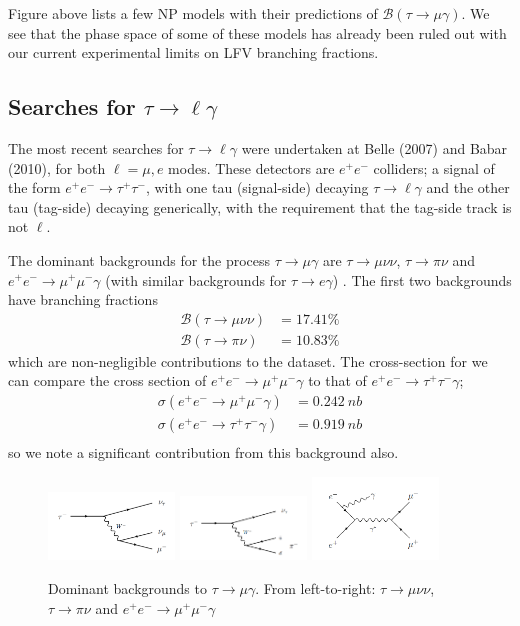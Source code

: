 \documentclass[12pt,a4paper]{article} %
\newcommand{\br}{\mathcal{B}}
\newcommand{\tmg}{\tau\to\mu\gamma}
\newcommand{\tlg}{\tau\to\ell\gamma}
\begin{document}
Figure above lists a few NP models with their predictions of $\br(\tmg)$. We see that the phase space of some of these models has already been ruled out with our current experimental limits on LFV branching fractions.



\subsection{Searches for $\tlg$}

The most recent searches for $\tlg$ were undertaken at Belle (2007) and Babar (2010), for both $\ell=\mu,e$ modes. These detectors are $e^+ e^-$ colliders; a signal of the form $e^+ e^-\to \tau^+ \tau^-$, with one tau (signal-side) decaying $\tau\to \ell \gamma$ and the other tau (tag-side) decaying generically, with the requirement that the tag-side track is not $\ell$.

The dominant backgrounds for the process $\tmg$ are $\tau\to \mu \nu \nu$, $\tau\to \pi \nu$ and $e^+ e^- \to \mu^+ \mu^- \gamma$ (with similar backgrounds for $\tau\to e \gamma$) \cite{Hayasaka:2007}. The first two backgrounds have branching fractions
\begin{align}
\br(\tau\to \mu \nu \nu)&=17.41\%\\
\br(\tau\to\pi\nu)&=10.83\%
\end{align}
which are non-negligible contributions to the dataset. The cross-section for we can compare the cross section of $e^+ e^- \to \mu^+ \mu^- \gamma$ to that of $e^+ e^- \to \tau^+ \tau^- \gamma$;
\begin{align}
\sigma(e^+ e^- \to \mu^+ \mu^- \gamma)&=\SI{0.242}{nb}\\
\sigma(e^+ e^- \to \tau^+ \tau^- \gamma)&=\SI{0.919}{nb}\\
\end{align}
so we note a significant contribution from this background also.

\begin{figure}[h]
\centering
\includegraphics[width=0.3\textwidth]{images/taumununu.png}
\includegraphics[width=0.3\textwidth]{images/taupinu.png}
\includegraphics[width=0.3\textwidth]{images/eemumugamma.png}
\caption{Dominant backgrounds to $\tmg$. From left-to-right: $\tau\to \mu \nu \nu$, $\tau\to \pi \nu$ and $e^+ e^- \to \mu^+ \mu^- \gamma$}
\end{figure}
\end{document}
